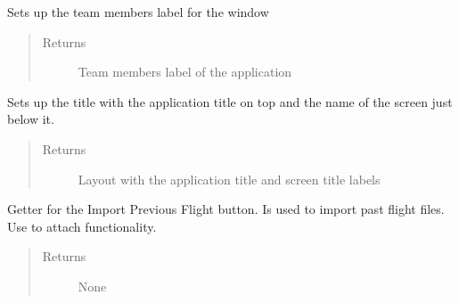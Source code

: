\documentclass[letterpaper,10pt,english]{sphinxmanual}
\begin{document}
\begin{fulllineitems}
\begin{fulllineitems}
\label{\detokenize{index:src.Views.View_StartupScreen.StartupWindow.setTeamMembers}}
Sets up the team members label for the window
\begin{quote}\begin{description}
\item[{Returns}] \leavevmode
Team members label of the application

\end{description}\end{quote}

\end{fulllineitems}


\begin{fulllineitems}
\label{\detokenize{index:src.Views.View_StartupScreen.StartupWindow.setTitle}}
Sets up the title with the application title on top and the name of the screen just below it.
\begin{quote}\begin{description}
\item[{Returns}] \leavevmode
Layout with the application title and screen title labels

\end{description}\end{quote}

\end{fulllineitems}


\begin{fulllineitems}
\label{\detokenize{index:src.Views.View_StartupScreen.StartupWindow.set_BtnImport}}
Getter for the Import Previous Flight button. Is used to import past flight files. Use to attach functionality.
\begin{quote}\begin{description}
\item[{Returns}] \leavevmode
None


\end{description}
\end{quote}
\end{fulllineitems}
\end{fulllineitems}
\end{document}
